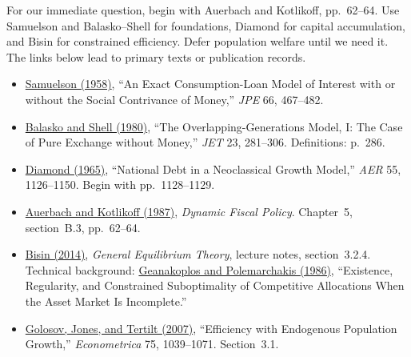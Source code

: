 \documentclass[11pt]{article}
\newcommand{\reading}[2]{\href{#1}{#2}}
\begin{document}
For our immediate question, begin with Auerbach and Kotlikoff, pp.~62--64.
Use Samuelson and Balasko--Shell for foundations, Diamond for capital accumulation,
and Bisin for constrained efficiency. Defer population welfare until we need it.
The links below lead to primary texts or publication records.

{\small
\begin{itemize}
\setlength{\itemsep}{0pt}
\item \reading{https://ludwigbc.com/wp-content/uploads/2013/08/samuelson_overlapping.pdf}{Samuelson (1958)}, ``An Exact Consumption-Loan Model of Interest with or without the Social Contrivance of Money,'' \emph{JPE} 66, 467--482.
\item \reading{https://karlshell.com/wp-content/uploads/2015/03/OGM_1.pdf}{Balasko and Shell (1980)}, ``The Overlapping-Generations Model, I: The Case of Pure Exchange without Money,'' \emph{JET} 23, 281--306. Definitions: p.~286.
\item \reading{https://assets.aeaweb.org/asset-server/files/9443.pdf}{Diamond (1965)}, ``National Debt in a Neoclassical Growth Model,'' \emph{AER} 55, 1126--1150. Begin with pp.~1128--1129.
\item \reading{https://kotlikoff.net/wp-content/uploads/2019/04/Dynamic-Fiscal-Policy.pdf}{Auerbach and Kotlikoff (1987)}, \emph{Dynamic Fiscal Policy}. Chapter~5, section~B.3, pp.~62--64.
\item \reading{https://bpb-us-e1.wpmucdn.com/wp.nyu.edu/dist/c/16384/files/2019/11/Lecture-notes-Oct2014.pdf}{Bisin (2014)}, \emph{General Equilibrium Theory}, lecture notes, section~3.2.4. Technical background: \reading{https://doi.org/10.1017/CBO9780511983566.007}{Geanakoplos and Polemarchakis (1986)}, ``Existence, Regularity, and Constrained Suboptimality of Competitive Allocations When the Asset Market Is Incomplete.''
\item \reading{https://jenni.uchicago.edu/Fertility/Golosov_Jones_Tertilt_2007_Econometrica_v75_n4.pdf}{Golosov, Jones, and Tertilt (2007)}, ``Efficiency with Endogenous Population Growth,'' \emph{Econometrica} 75, 1039--1071. Section~3.1.
\end{itemize}
}
\end{document}
